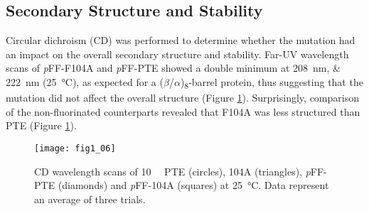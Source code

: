 \begin{refsection}
\subsection{Secondary Structure and Stability}

Circular dichroism (CD) was performed to determine whether the mutation had an
impact on the overall secondary structure and stability. Far-UV wavelength
scans of \emph{p}FF-F104A and \emph{p}FF-PTE showed a double minimum at
\SIlist{208;222}{\nm} (\SI{25}{\celsius}), as expected for a
($\beta$/$\alpha$)\textsubscript{8}-barrel protein, thus suggesting that the
mutation did not affect the overall structure (Figure \ref{fig:CD-fig}).
Surprisingly, comparison of the non-fluorinated counterparts revealed that
F104A was less structured than PTE (Figure \ref{fig:CD-fig}). 
\begin{figure}[h!] \centering \texttt{[image: fig1\_06]}
    \caption[CD wavelength scans of \SI{10}{\micro\Molar} PTE (circles), 104A (triangles),
    \emph{p}FF-PTE (diamonds) and \emph{p}FF-104A (squares) at
\SI{25}{\celsius}. Data represent an average of three trials.]{CD wavelength
    scans of \SI{10}{\micro\Molar} PTE (circles), 104A (triangles),
    \emph{p}FF-PTE (diamonds) and \emph{p}FF-104A (squares) at
    \SI{25}{\celsius}. Data represent an average of three trials.}
    \label{fig:CD-fig} 
\end{figure}


\end{refsection}
